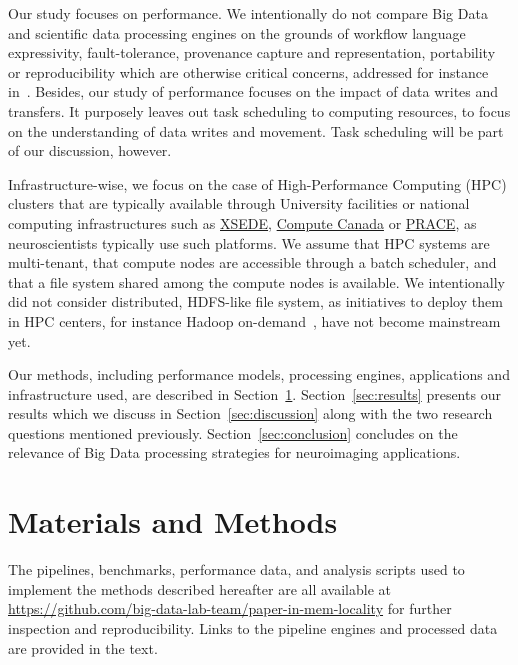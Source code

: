 \documentclass{IEEEtran}
\newcommand{\todo}[1]{\marginpar{\parbox{18mm}{\flushleft\tiny\color{red}\textbf{TODO}:
      #1}}}
\begin{document}
Our study focuses on performance. We intentionally do not 
compare Big Data and scientific data processing engines on the grounds 
of workflow language expressivity, fault-tolerance, provenance capture 
and representation, portability or reproducibility which are otherwise 
critical concerns, addressed for instance in~\cite{samba}. Besides, our 
study of performance focuses on the impact of data writes and 
transfers. It purposely leaves out task scheduling to computing 
resources, to focus on the understanding of 
data writes and movement. Task scheduling will be part of our 
discussion, however.

Infrastructure-wise, we focus on the case of High-Performance Computing 
(HPC) clusters that are typically available through University 
facilities or national computing infrastructures such as 
\href{xsede.org}{XSEDE}, \href{http://computecanada.ca}{Compute Canada} 
or \href{http://www.prace-ri.eu}{PRACE}, as neuroscientists typically use such platforms.
 We assume that HPC systems are 
multi-tenant, that compute nodes are accessible through a batch 
scheduler, and that a file system shared among the compute nodes is 
available. We intentionally did not consider distributed, 
HDFS-like file system, as initiatives to deploy them in HPC 
centers, for instance Hadoop on-demand~\cite{krishnan2011myhadoop}, have not 
become mainstream yet.


Our methods, including performance models, processing engines, 
applications and infrastructure used, are described in 
Section~\ref{sec:methods}. Section~\ref{sec:results} presents our 
results which we discuss in Section~\ref{sec:discussion} along with the 
two research questions mentioned previously. 
Section~\ref{sec:conclusion} concludes on the relevance of Big Data 
processing strategies for neuroimaging applications.

\section{Materials and Methods} %
\label{sec:methods}

The pipelines, benchmarks, performance data, and analysis scripts used 
to implement the methods described hereafter are all available at 
\url{https://github.com/big-data-lab-team/paper-in-mem-locality} for 
further inspection and reproducibility. Links to the pipeline engines 
and processed data are provided in the text.
\end{document}
